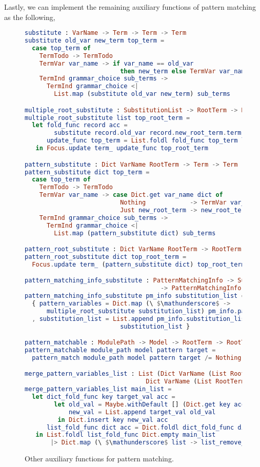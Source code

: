 \documentclass[master.tex]{subfiles}
\begin{document}
Lastly, we can implement the remaining auxiliary functions of pattern matching
as the following,

\begin{figure}[H]
\begin{framed}
\begin{lstlisting}[language=elm,basicstyle=\scriptsize\ttfamily]
substitute : VarName -> Term -> Term -> Term
substitute old_var new_term top_term =
  case top_term of
    TermTodo -> TermTodo
    TermVar var_name -> if var_name == old_var
                          then new_term else TermVar var_name
    TermInd grammar_choice sub_terms ->
      TermInd grammar_choice <|
        List.map (substitute old_var new_term) sub_terms

multiple_root_substitute : SubstitutionList -> RootTerm -> RootTerm
multiple_root_substitute list top_root_term =
  let fold_func record acc =
        substitute record.old_var record.new_root_term.term acc
      update_func top_term = List.foldl fold_func top_term list
   in Focus.update term_ update_func top_root_term

pattern_substitute : Dict VarName RootTerm -> Term -> Term
pattern_substitute dict top_term =
  case top_term of
    TermTodo -> TermTodo
    TermVar var_name -> case Dict.get var_name dict of
                          Nothing            -> TermVar var_name
                          Just new_root_term -> new_root_term.term
    TermInd grammar_choice sub_terms ->
      TermInd grammar_choice <|
        List.map (pattern_substitute dict) sub_terms

pattern_root_substitute : Dict VarName RootTerm -> RootTerm -> RootTerm
pattern_root_substitute dict top_root_term =
  Focus.update term_ (pattern_substitute dict) top_root_term

pattern_matching_info_substitute : PatternMatchingInfo -> SubstitutionList
                                     -> PatternMatchingInfo
pattern_matching_info_substitute pm_info substitution_list =
  { pattern_variables = Dict.map (\ $\mathunderscore$ ->
      multiple_root_substitute substitution_list) pm_info.pattern_variables
  , substitution_list = List.append pm_info.substitution_list
                          substitution_list }

pattern_matchable : ModulePath -> Model -> RootTerm -> RootTerm -> Bool
pattern_matchable module_path model pattern target =
  pattern_match module_path model pattern target /= Nothing

merge_pattern_variables_list : List (Dict VarName (List RootTerm)) ->
                                 Dict VarName (List RootTerm)
merge_pattern_variables_list main_list =
  let dict_fold_func key target_val acc =
        let old_val = Maybe.withDefault [] (Dict.get key acc)
            new_val = List.append target_val old_val
         in Dict.insert key new_val acc
      list_fold_func dict acc = Dict.foldl dict_fold_func dict acc
   in List.foldl list_fold_func Dict.empty main_list
       |> Dict.map (\ $\mathunderscore$ list -> list_remove_duplication list)
\end{lstlisting}
\end{framed}
\caption{Other auxiliary functions for pattern matching.}
\end{figure}
\end{document}
